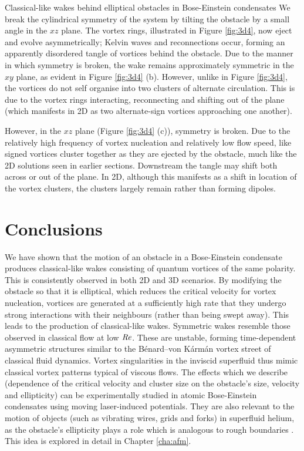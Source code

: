 \begin{chapter}{\label{cha:wake}Classical-like wakes behind elliptical obstacles in Bose-Einstein condensates}
We break the cylindrical symmetry of the system by tilting the obstacle by a small angle in the $xz$ plane.  The vortex rings, illustrated in Figure \ref{fig:3d4}, now eject and evolve asymmetrically; Kelvin waves and reconnections occur, forming an apparently disordered tangle of vortices behind the obstacle.  Due to the manner in which symmetry is broken, the wake remains approximately symmetric in the $xy$ plane, as evident in Figure \ref{fig:3d4} (b).  However, unlike in Figure \ref{fig:3d4}, the vortices do not self organise into two clusters of alternate circulation. This is due to the vortex rings interacting, reconnecting and shifting out of the plane (which manifests in 2D as two alternate-sign vortices approaching one another).



However, in the $xz$ plane (Figure \ref{fig:3d4} (c)), symmetry is broken. Due to the relatively high frequency of vortex nucleation and relatively low flow speed, like signed vortices cluster together as they are ejected by the obstacle, much like the 2D solutions seen in earlier sections.  Downstream the tangle may shift both across or out of the plane. In 2D, although this manifests as a shift in location of the vortex clusters, the clusters largely remain rather than forming dipoles. 

\section{Conclusions}
We have shown that the motion of an obstacle in a Bose-Einstein condensate produces classical-like wakes consisting of quantum vortices of the same polarity.  This is consistently observed in both 2D and 3D scenarios.  By modifying the obstacle so that it is elliptical, which reduces the critical velocity for vortex nucleation, vortices are generated at a sufficiently high rate that they undergo strong interactions with their neighbours  (rather than being swept away). This leads to the production of classical-like wakes. Symmetric wakes resemble those observed in classical flow at low $\mbox{\ensuremath{\mathit{Re}}}$.  These are unstable, forming time-dependent asymmetric structures similar to the B\'enard--von K\'arm\'an vortex street of classical fluid dynamics. Vortex singularities
in the inviscid superfluid thus mimic classical vortex patterns typical of viscous flows.  The effects which we describe (dependence of the critical velocity and cluster size on the obstacle's size, velocity and ellipticity) can be experimentally studied in atomic Bose-Einstein condensates using moving laser-induced potentials. They are also relevant to the motion of objects (such as vibrating wires, grids and forks) in superfluid helium, as the obstacle's ellipticity plays a role which is analogous to rough boundaries \cite{blaz08,brad05}. This idea is explored in detail in Chapter \ref{cha:afm}.



\end{chapter}
